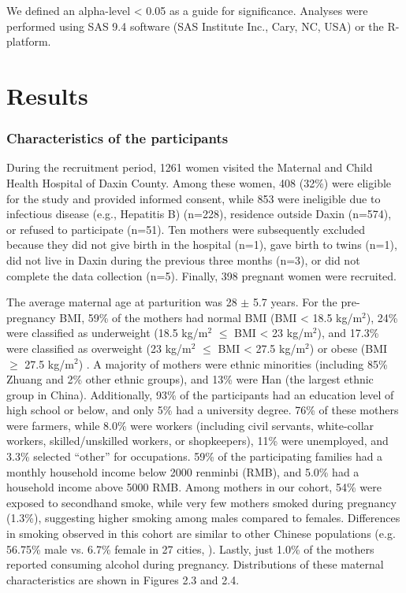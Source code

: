 We defined an alpha-level < 0.05 as a guide for significance. Analyses were performed using SAS 9.4 software (SAS Institute Inc., Cary, NC, USA) or the R-platform.

\section{Results}

\subsubsection{Characteristics of the participants}

During the recruitment period, 1261 women visited the Maternal and Child Health Hospital of Daxin County. Among these women, 408 (32\%) were eligible for the study and provided informed consent, while 853 were ineligible due to infectious disease (e.g., Hepatitis B) (n=228), residence outside Daxin (n=574), or refused to participate (n=51). Ten mothers were subsequently excluded because they did not give birth in the hospital (n=1), gave birth to twins (n=1), did not live in Daxin during the previous three months (n=3), or did not complete the data collection (n=5). Finally, 398 pregnant women were recruited. 

The average maternal age at parturition was 28 \({\pm}\) 5.7 years. For the pre-pregnancy BMI, 59\% of the mothers had normal BMI (BMI < 18.5 kg/\(\text{m}^{2}\)), 24\% were classified as underweight (18.5 kg/\(\text{m}^{2}\) ${\le}$ BMI < 23 kg/\(\text{m}^{2}\)), and 17.3\% were classified as overweight (23 kg/\(\text{m}^{2}\) ${\le}$  BMI < 27.5 kg/\(\text{m}^{2}\)) or obese (BMI ${\ge}$ 27.5 kg/\(\text{m}^{2}\)) \citep{who2004appropriate}. A majority of mothers were ethnic minorities (including 85\% Zhuang and 2\% other ethnic groups), and 13\% were Han (the largest ethnic group in China). Additionally, 93\% of the participants had an education level of high school or below, and only 5\% had a university degree. 76\% of these mothers were farmers, while 8.0\% were workers (including civil servants, white-collar workers, skilled/unskilled workers, or shopkeepers), 11\% were unemployed, and 3.3\% selected ``other'' for occupations. 59\% of the participating families had a monthly household income below 2000 renminbi (RMB), and 5.0\% had a household income above 5000 RMB. Among mothers in our cohort, 54\% were exposed to secondhand smoke, while very few mothers smoked during pregnancy (1.3\%), suggesting higher smoking among males compared to females. Differences in smoking observed in this cohort are similar to other Chinese populations (e.g. 56.75\% male vs. 6.7\% female in 27 cities, \cite{yang2015impact}). Lastly, just 1.0\% of the mothers reported consuming alcohol during pregnancy. Distributions of these maternal characteristics are shown in Figures 2.3 and 2.4.


